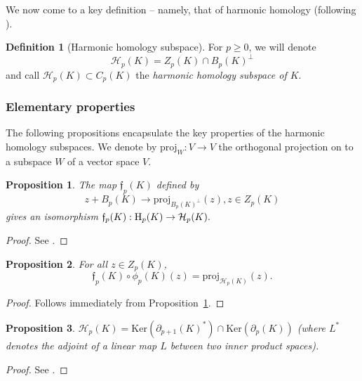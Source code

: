 \documentclass[11pt]{amsart}
\theoremstyle{theorem}
\newtheorem{proposition}{Proposition}[section]
\theoremstyle{remark}
\theoremstyle{definition}
\newtheorem{definition}{Definition}[section]
\newcommand {\Ker}      {\mathrm{Ker}}
\newcommand{\HH}  {\mbox{\rm H}}
\begin{document}
We now come to a key definition -- namely, that of harmonic homology (following \cite{Eckmann}).
\begin{definition}[Harmonic homology subspace]
\label{def:harmonic}
For $p \geq 0$,  we will denote 
\[
\mathcal{H}_p(K) = Z_p(K)  \cap  B_p(K)^\perp
\]
and call $\mathcal{H}_p(K) \subset C_p(K)$ the \emph{harmonic homology subspace of $K$}. 
\end{definition}

\subsubsection{Elementary properties}
The following  propositions encapsulate the key properties of the harmonic homology subspaces. We denote by $\mathrm{proj}_W:V \rightarrow V$ the orthogonal projection on to a subspace $W$ of a vector space $V$.
\begin{proposition}
\label{prop:f}
The map  $\mathfrak{f}_p(K)$ defined by 
\begin{equation}
    \label{eqn:f}
    z + B_p(K) \rightarrow \mathrm{proj}_{B_p(K)^\perp}(z), z \in Z_p(K)
\end{equation}
gives an isomorphism
$
\mathfrak{f}_p(K): \HH_p(K)  \rightarrow \mathcal{H}_p(K).
$
\end{proposition}

\begin{proof}
See \cite{Basu-Cox}.
\end{proof}

\begin{proposition}
\label{prop:proj}
For all $z \in Z_p(K)$,
    \[
    \mathfrak{f}_p(K) \circ \phi_p(K)(z)  = \mathrm{proj}_{\mathcal{H}_p(K)}(z).
    \]
\end{proposition}

\begin{proof}
    Follows immediately from Proposition~\ref{prop:f}. 
\end{proof}

\begin{proposition}
\label{prop:intersection}
$
\mathcal{H}_p(K) = \Ker(\partial_{p+1}(K)^*) \cap \Ker(\partial_{p}(K))
$
(where $L^*$ denotes the adjoint of a linear map $L$ between two inner product spaces).
\end{proposition}



\begin{proof}
See \cite{Basu-Cox}.
\end{proof}
\end{document}
